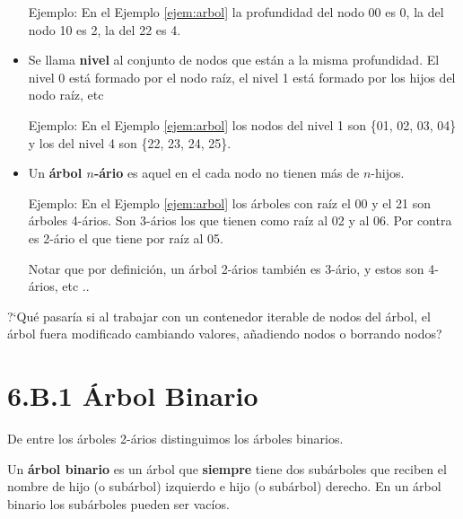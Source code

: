 \begin{itemize}
Ejemplo: En el Ejemplo \ref{ejem:arbol} la profundidad del nodo 00 es 0, la del nodo 10 es 2, la del 22 es 4.


\item Se llama \textbf{nivel} al conjunto de nodos que están a la misma profundidad. 
El nivel 0 está formado por el nodo raíz, el nivel 1 está formado por los hijos del nodo raíz, etc 

Ejemplo: En el Ejemplo \ref{ejem:arbol} los nodos del nivel 1 son \{01, 02, 03, 04\} y los del nivel 4 son \{22, 23, 24, 25\}.

\item 
Un \textbf{árbol $n$-ário} es aquel en el cada nodo no tienen más de $n$-hijos.

Ejemplo: En el Ejemplo \ref{ejem:arbol} los árboles con raíz el 00 y el 21 son árboles 4-ários.
Son 3-ários los que tienen como raíz al 02 y al 06. Por contra es 2-ário el que tiene por raíz al 05.

Notar que por definición, un árbol 2-ários también es 3-ário, y estos son 4-ários, etc ..
\end{itemize}








?`Qué pasaría si al trabajar con un contenedor iterable de nodos del árbol, el árbol fuera modificado cambiando valores, añadiendo nodos o borrando nodos?





\section*{6.B.1 Árbol Binario}
\label{sec:ArbolBinario}


De entre los árboles 2-ários distinguimos los árboles binarios. 

\begin{definition}{}
Un \textbf{árbol binario} es un árbol que \textbf{siempre} tiene dos subárboles que reciben el nombre de hijo (o subárbol) izquierdo e hijo (o subárbol) derecho. En un árbol binario los subárboles pueden ser vacíos.
\end{definition}

